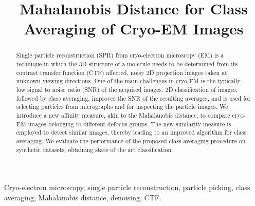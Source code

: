 \documentclass{article}
\title{Mahalanobis Distance for Class Averaging of Cryo-EM Images}
\begin{document}
%
\maketitle
%
\begin{abstract}
Single particle reconstruction (SPR) from cryo-electron microscopy (EM) is a technique in which the 3D structure of a molecule needs to be determined from its contrast transfer function (CTF) affected, noisy 2D projection images taken at unknown viewing directions. One of the main challenges in cryo-EM is the typically low signal to noise ratio (SNR) of the acquired images. 2D classification of images, followed by class averaging, improves the SNR of the resulting averages, and is used for selecting particles from micrographs and for inspecting the particle images. We introduce a new affinity measure, akin to the Mahalanobis distance, to compare cryo-EM images belonging to different defocus groups. The new similarity measure is employed to detect similar images, thereby leading to an improved algorithm for class averaging. We evaluate the performance of the proposed class averaging procedure on synthetic datasets, obtaining state of the art classification.

\end{abstract}
%
\begin{keywords}
Cryo-electron microscopy, single particle reconstruction, particle picking, class averaging, Mahalanobis distance, denoising, CTF.
\end{keywords}
%
\end{document}
